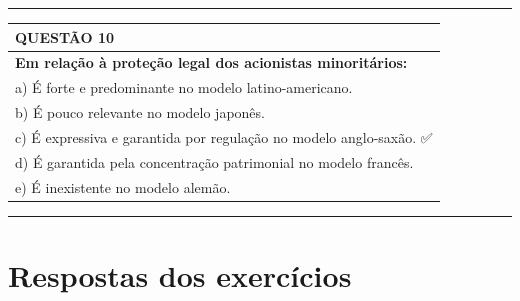 \documentclass[
]{book}
\begin{document}
\begin{center}\rule{0.5\linewidth}{0.5pt}\end{center}

\begin{longtable}[]{@{}l@{}}
\toprule\noalign{}
\textbf{QUESTÃO 10} \\
\midrule\noalign{}
\endhead
\bottomrule\noalign{}
\endlastfoot
\textbf{Em relação à proteção legal dos acionistas minoritários:} \\
a) É forte e predominante no modelo latino-americano. \\
b) É pouco relevante no modelo japonês. \\
c) É expressiva e garantida por regulação no modelo anglo-saxão. ✅ \\
d) É garantida pela concentração patrimonial no modelo francês. \\
e) É inexistente no modelo alemão. \\
\end{longtable}

\begin{center}\rule{0.5\linewidth}{0.5pt}\end{center}

\section{Respostas dos exercícios}\label{respostas-dos-exercuxedcios}
\end{document}
